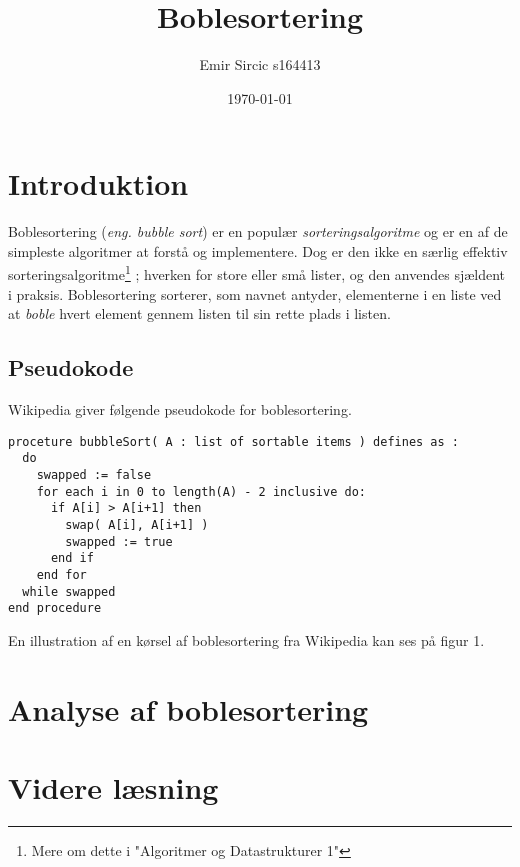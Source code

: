\documentclass[a4paper]{article}
\title{Boblesortering}
\author{Emir Sircic s164413}
\date{\today}
\begin{document}
\maketitle

\section{Introduktion}

Boblesortering (\emph{eng. bubble sort}) er en populær \emph{sorteringsalgoritme} og er en af de simpleste algoritmer at forstå og implementere. Dog er den ikke en særlig effektiv sorteringsalgoritme\footnote{Mere om dette i "Algoritmer og Datastrukturer 1"} ; hverken for store eller små lister, og den anvendes sjældent i praksis. Boblesortering sorterer, som navnet antyder, elementerne i en liste ved at \emph{boble} hvert element gennem listen til sin rette plads i listen.

\subsection{Pseudokode}
Wikipedia \cite{Wikipedia} giver følgende pseudokode for boblesortering.
\begin{verbatim}
proceture bubbleSort( A : list of sortable items ) defines as :
  do 
    swapped := false
    for each i in 0 to length(A) - 2 inclusive do:
      if A[i] > A[i+1] then
        swap( A[i], A[i+1] )
        swapped := true
      end if
    end for
  while swapped
end procedure
\end{verbatim}
En illustration af en kørsel af boblesortering fra Wikipedia kan ses på figur 1.
\section{Analyse af boblesortering}
\section{Videre læsning}
\end{document}
